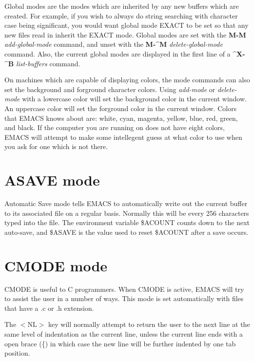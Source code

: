 Global modes are the modes which are inherited by any new
buffers which are created.  For example, if you wish to always do string
searching with character case being significant, you would want global
mode EXACT to be set so that any new files read in inherit the EXACT
mode.  Global modes are set with the {\bf{}M-M} {\it{}add-global-mode}
 command, and unset with the {\bf{}M-\^{}M}
{\it{}delete-global-mode}  command.  Also, the
current global modes are displayed in the first line of a
{\bf{}\^{}X-\^{}B} {\it{}list-buffers}  command.

On machines which are capable of displaying colors,  the
mode commands can also set the background and forground character
colors.  Using {\it{}add-mode} or {\it{}delete-mode} with a lowercase
color will set the background color in the current window.  An
uppercase color will set the forground color in the current window.
Colors that EMACS knows about are: white, cyan, magenta, yellow, blue,
red, green, and black.  If the computer you are running on does not
have eight colors, EMACS will attempt to make some intellegent guess
at what color to use when you ask for one which is not there.

\section{ASAVE mode}

Automatic Save mode tells EMACS to automatically write out the
current buffer to its associated file on a regular basis.  Normally this
will be every 256 characters typed into the file.  The environment
variable \$ACOUNT counts down to the next auto-save, and \$ASAVE is the
value used to reset \$ACOUNT after a save occurs.

\section{CMODE mode}

CMODE is useful to C programmers.  When CMODE is active, EMACS
will try to assist the user in a number of ways.  This mode is set
automatically with files that have a .c or .h extension.

The $<${}NL$>${} key will normally attempt to return the user to the next
line at the same level of indentation as the current line, unless the
current line ends with a open brace (\{) in which case the new line will
be further indented by one tab position.

